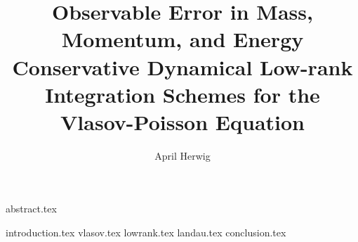 \documentclass[a4paper]{article}
\title{
    Observable Error in 
    Mass, Momentum, and Energy Conservative 
    Dynamical Low-rank Integration Schemes 
    for the Vlasov-Poisson Equation
}
\author{April Herwig}
\begin{document}
\maketitle

{abstract.tex}

\tableofcontents

{introduction.tex}
{vlasov.tex}
{lowrank.tex}
{landau.tex}
{conclusion.tex}

\printbibliography
\end{document}
